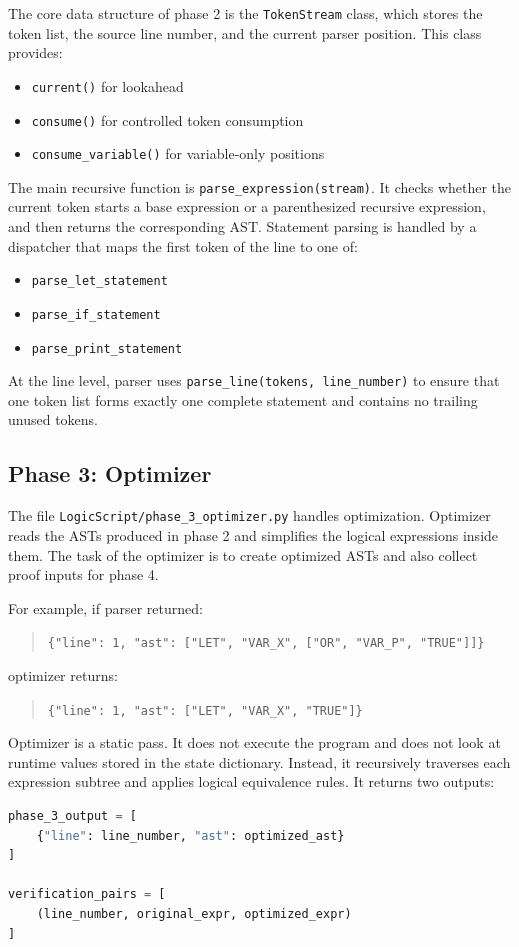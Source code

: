 \documentclass[11pt]{article}
\begin{document}
The core data structure of phase 2 is the \texttt{TokenStream} class, which stores the token list, the source line number, and the current parser position. This class provides:
\begin{itemize}
    \item \texttt{current()} for lookahead
    \item \texttt{consume()} for controlled token consumption
    \item \texttt{consume\_variable()} for variable-only positions
\end{itemize}

The main recursive function is \texttt{parse\_expression(stream)}. It checks whether the current token starts a base expression or a parenthesized recursive expression, and then returns the corresponding AST. Statement parsing is handled by a dispatcher that maps the first token of the line to one of:
\begin{itemize}
    \item \texttt{parse\_let\_statement}
    \item \texttt{parse\_if\_statement}
    \item \texttt{parse\_print\_statement}
\end{itemize}

At the line level, parser uses \texttt{parse\_line(tokens, line\_number)} to ensure that one token list forms exactly one complete statement and contains no trailing unused tokens.

\subsection{Phase 3: Optimizer}
The file \texttt{LogicScript/phase\_3\_optimizer.py} handles optimization. Optimizer reads the ASTs produced in phase 2 and simplifies the logical expressions inside them. The task of the optimizer is to create optimized ASTs and also collect proof inputs for phase 4.

For example, if parser returned:
\begin{quote}
\texttt{\{"line": 1, "ast": ["LET", "VAR\_X", ["OR", "VAR\_P", "TRUE"]]\}}
\end{quote}
optimizer returns:
\begin{quote}
\texttt{\{"line": 1, "ast": ["LET", "VAR\_X", "TRUE"]\}}
\end{quote}

Optimizer is a static pass. It does not execute the program and does not look at runtime values stored in the state dictionary. Instead, it recursively traverses each expression subtree and applies logical equivalence rules. It returns two outputs:
\begin{lstlisting}[language=Python]
phase_3_output = [
    {"line": line_number, "ast": optimized_ast}
]

verification_pairs = [
    (line_number, original_expr, optimized_expr)
]
\end{lstlisting}
\end{document}
